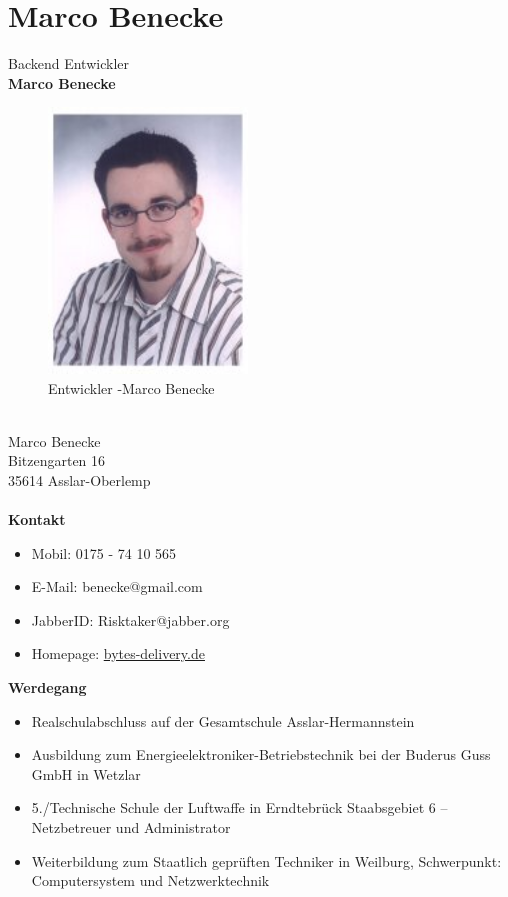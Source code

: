 \section{Marco Benecke}
\label{section:Marco Benecke}
Backend Entwickler \\
\textbf{Marco Benecke}
\\
\begin{figure}[h]
   \includegraphics[width=150pt]{../bilder/marcob.jpg}
   \caption{Entwickler -Marco Benecke}
   \label{Entwickler - Backend und Datenbank}
\end{figure}
\\
Marco Benecke \\
Bitzengarten 16 \\
35614 Asslar-Oberlemp \\
\\
\textbf{Kontakt} \\
\begin{itemize}
\item Mobil: 0175 - 74 10 565
\item E-Mail: benecke@gmail.com
\item JabberID: Risktaker@jabber.org 
\item Homepage: \href{http://www.bytes-delivery.de}{bytes-delivery.de}
\end{itemize}
\textbf{Werdegang} \\
\begin{itemize}
\item Realschulabschluss auf der Gesamtschule Asslar-Hermannstein
\item Ausbildung zum Energieelektroniker-Betriebstechnik bei der Buderus Guss GmbH in Wetzlar
\item 5./Technische Schule der Luftwaffe in Erndtebrück Staabsgebiet 6 – Netzbetreuer und Administrator
\item Weiterbildung zum Staatlich geprüften Techniker in Weilburg, Schwerpunkt: Computersystem und Netzwerktechnik	
\end{itemize}
\newpage

